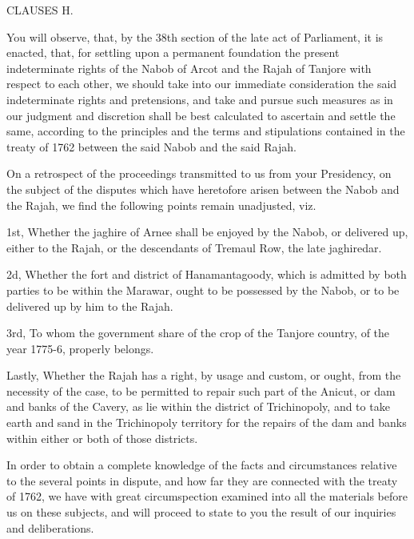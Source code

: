 \vspace{0.3cm}
\centerline{CLAUSES H.}

You will observe, that, by the 38th section of the late act of Parliament, it is enacted, that, for settling upon a permanent foundation the present indeterminate rights of the Nabob of Arcot and the Rajah of Tanjore with respect to each other, we should take into our immediate consideration the said indeterminate rights and pretensions, and take and pursue such measures as in our judgment and discretion shall be best calculated to ascertain and settle the same, according to the principles and the terms and stipulations contained in the treaty of 1762 between the said Nabob and the said Rajah.

On a retrospect of the proceedings transmitted to us from your Presidency, on the subject of the disputes which have heretofore arisen between the Nabob and the Rajah, we find the following points remain unadjusted, viz.

1st, Whether the jaghire of Arnee shall be enjoyed by the Nabob, or delivered up, either to the Rajah, or the descendants of Tremaul Row, the late jaghiredar.

2d, Whether the fort and district of Hanamantagoody, which is admitted by both parties to be within the Marawar, ought to be possessed by the Nabob, or to be delivered up by him to the Rajah.

3rd, To whom the government share of the crop of the Tanjore country, of the year 1775-6, properly belongs.

Lastly, Whether the Rajah has a right, by usage and custom, or ought, from the necessity of the case, to be permitted to repair such part of the Anicut, or dam and banks of the Cavery, as lie within the district of Trichinopoly, and to take earth and sand in the Trichinopoly territory for the repairs of the dam and banks within either or both of those districts.

In order to obtain a complete knowledge of the facts and circumstances relative to the several points in dispute, and how far they are connected with the treaty of 1762, we have with great circumspection examined into all the materials before us on these subjects, and will proceed to state to you the result of our inquiries and deliberations.

